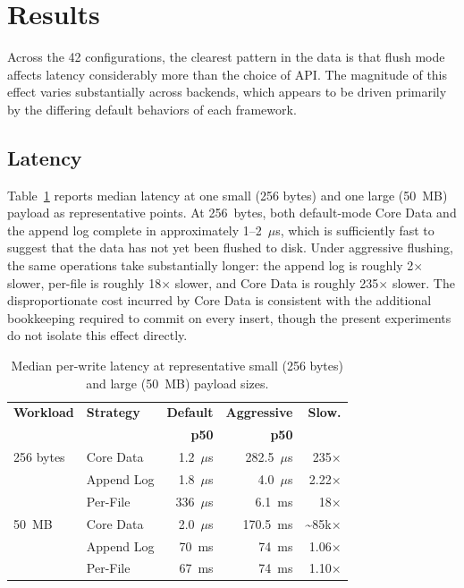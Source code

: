 \section{Results}
Across the 42 configurations, the clearest pattern in the data is that
flush mode affects latency considerably more than the choice of API.
The magnitude of this effect varies substantially across backends,
which appears to be driven primarily by the differing default
behaviors of each framework.

\subsection{Latency}
Table~\ref{tab:latency} reports median latency at one small (256 bytes)
and one large (50~MB) payload as representative points. At 256~bytes,
both default-mode Core Data and the append log complete in
approximately 1--2~$\mu$s, which is sufficiently fast to suggest that
the data has not yet been flushed to disk. Under aggressive flushing,
the same operations take substantially longer: the append log is
roughly 2$\times$ slower, per-file is roughly 18$\times$ slower, and
Core Data is roughly 235$\times$ slower. The disproportionate cost
incurred by Core Data is consistent with the additional bookkeeping
required to commit on every insert, though the present experiments do
not isolate this effect directly.

\begin{table}[t]
\centering
\footnotesize
\setlength{\tabcolsep}{4pt}
\begin{tabular}{@{}llrrr@{}}
\hline
\textbf{Workload} & \textbf{Strategy} & \textbf{Default} & \textbf{Aggressive} & \textbf{Slow.} \\
                  &                   & \textbf{p50}     & \textbf{p50}        &                \\
\hline
256 bytes  & Core Data  & 1.2~$\mu$s & 282.5~$\mu$s & 235$\times$ \\
       & Append Log & 1.8~$\mu$s & 4.0~$\mu$s   & 2.22$\times$ \\
       & Per-File   & 336~$\mu$s & 6.1~ms       & 18$\times$ \\
\hline
50~MB  & Core Data  & 2.0~$\mu$s & 170.5~ms     & {\textasciitilde}85k$\times$ \\
       & Append Log & 70~ms      & 74~ms        & 1.06$\times$ \\
       & Per-File   & 67~ms      & 74~ms        & 1.10$\times$ \\
\hline
\end{tabular}
\caption{Median per-write latency at representative small (256 bytes) and
  large (50~MB) payload sizes.}
\label{tab:latency}
\end{table}

